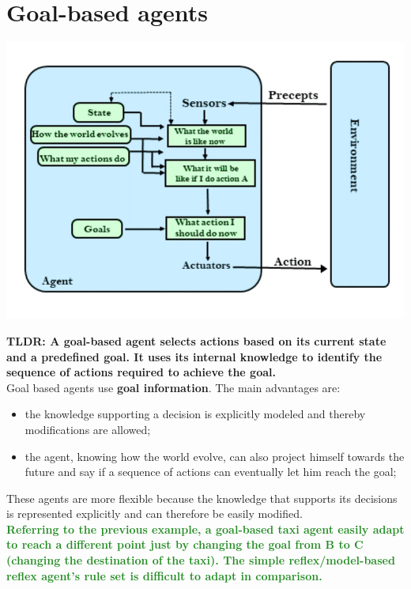 \documentclass{article}
\begin{document}
\newpage

\section{Goal-based agents}

\begin{center}
    \includegraphics[scale=0.4]{images/goal_based_agent.jpg}
\end{center}

\textbf{TLDR: A goal-based agent selects actions based on its current state and a predefined goal. It uses its internal knowledge to identify the sequence of actions required to achieve the goal.} \\

Goal based agents use \textbf{goal information}. The main advantages are:

\begin{itemize}
    \item the knowledge supporting a decision is explicitly modeled and thereby modifications are allowed;
    \item the agent, knowing how the world evolve, can also project himself towards the future and say if a sequence of actions can eventually let him reach the goal;
\end{itemize}

These agents are more flexible because the knowledge that supports its decisions is represented explicitly and can therefore be easily modified. \\

\textcolor{ForestGreen}{\textbf{Referring to the previous example, a goal-based taxi agent easily adapt to reach a different point just by changing the goal from B to C (changing the destination of the taxi). The simple reflex/model-based reflex agent's rule set is difficult to adapt in comparison.}} 
\end{document}
